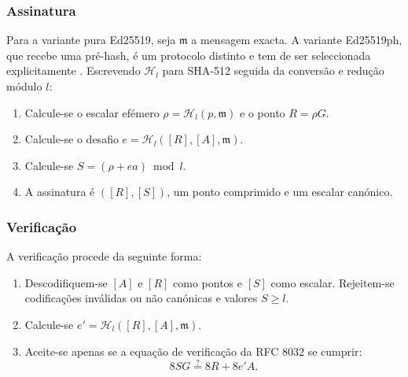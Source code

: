 
\subsubsection*{Assinatura}

Para a variante pura Ed25519, seja \(\mathfrak{m}\) a mensagem exacta. A
variante Ed25519ph, que recebe uma pré-hash, é um protocolo distinto e tem de
ser seleccionada explicitamente \cite{rfc8032}. Escrevendo \(\mathcal{H}_l\)
para SHA-512 seguida da conversão e redução módulo \(l\):

\begin{enumerate}
	\item Calcule-se o escalar efémero
    \(\rho=\mathcal{H}_l(p,\mathfrak{m})\) e o ponto \(R=\rho G\).

	
	\item Calcule-se o desafio
    \(e=\mathcal{H}_l([R],[A],\mathfrak{m})\).

	\item Calcule-se \(S=(\rho+ea)\bmod l\).
	
	\item A assinatura é \(([R],[S])\), um ponto comprimido e um escalar
    canónico.
\end{enumerate}

\subsubsection*{Verificação}
A verificação procede da seguinte forma:

\begin{enumerate}
	\item Descodifiquem-se \([A]\) e \([R]\) como pontos e \([S]\) como
    escalar. Rejeitem-se codificações inválidas ou não canónicas e valores
    \(S\geq l\).
	\item Calcule-se \(e'=\mathcal{H}_l([R],[A],\mathfrak{m})\).
	\item Aceite-se apenas se a equação de verificação da RFC 8032 se cumprir:
    \[
    8SG\stackrel{?}{=}8R+8e'A.
    \]
\end{enumerate}

